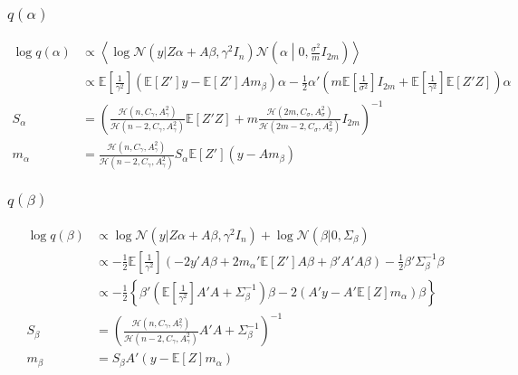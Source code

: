 \documentclass[11pt]{article}
\begin{document}
\subsubsection{$q\left(\alpha\right)$}
\begin{align*}
  \log q\left(\alpha\right) &\propto \left\langle\log\mathcal{N}\left(y|Z\alpha + A\beta, \gamma^{2}I_{n}\right)\mathcal{N}\left(\alpha\middle| 0, \frac{\sigma^{2}}{m}I_{2m}\right)\right\rangle\\
  &\propto \mathbb{E}\left[\frac{1}{\gamma^{2}}\right]\left(\mathbb{E}\left[Z'\right]y - \mathbb{E}\left[Z'\right]Am_{\beta}\right)\alpha - \frac{1}{2}\alpha' \left(m\mathbb{E}\left[\frac{1}{\sigma^{2}}\right]I_{2m} +\mathbb{E}\left[\frac{1}{\gamma^{2}}\right]\mathbb{E}\left[Z'Z\right]\right)\alpha\\
  S_{\alpha} &= \left(\frac{\mathcal{H}\left(n, C_{\gamma}, A_{\gamma}^{2}\right)}{\mathcal{H}\left(n-2, C_{\gamma}, A_{\gamma}^{2}\right)}\mathbb{E}\left[Z'Z\right] +m\frac{\mathcal{H}\left(2m, C_{\sigma}, A_{\sigma}^{2}\right)}{\mathcal{H}\left(2m-2, C_{\sigma}, A_{\sigma}^{2}\right)}I_{2m} \right)^{-1}\\
  m_{\alpha} &= \frac{\mathcal{H}\left(n, C_{\gamma}, A_{\gamma}^{2}\right)}{\mathcal{H}\left(n-2, C_{\gamma}, A_{\gamma}^{2}\right)}S_{\alpha}\mathbb{E}\left[Z'\right] \left(y - Am_{\beta}\right)
\end{align*}
\subsubsection{$q\left(\beta\right)$}
\begin{align*}
  \log q\left(\beta\right) &\propto \log \mathcal{N}\left(y|Z\alpha + A\beta, \gamma^{2}I_{n}\right) + \log \mathcal{N}\left(\beta|0, \Sigma_{\beta}\right)\\
  &\propto -\frac{1}{2}\mathbb{E}\left[\frac{1}{\gamma^{2}}\right]\left(-2y'A\beta+2m_{\alpha}'\mathbb{E}\left[Z'\right]A\beta + \beta'A'A\beta\right) -\frac{1}{2}\beta'\Sigma_{\beta}^{-1}\beta\\
  &\propto -\frac{1}{2}\left\{\beta'\left(\mathbb{E}\left[\frac{1}{\gamma^{2}}\right]A'A +\Sigma_{\beta}^{-1} \right)\beta -2\left(A'y -A'\mathbb{E}\left[Z\right]m_{\alpha}\right)\beta \right\}\\
  S_{\beta} &= \left(\frac{\mathcal{H}\left(n, C_{\gamma}, A_{\gamma}^{2}\right)}{\mathcal{H}\left(n-2, C_{\gamma}, A_{\gamma}^{2}\right)}A'A +\Sigma_{\beta}^{-1}\right)^{-1}\\
  m_{\beta} &= S_{\beta}A'\left(y-\mathbb{E}\left[Z\right]m_{\alpha}\right)
\end{align*}
\end{document}
